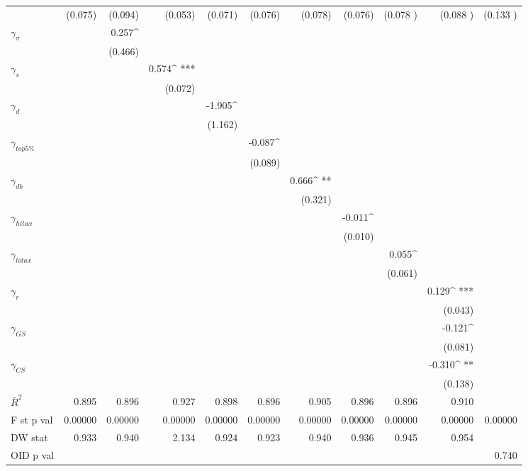 \begin{sidewaystable}
\begin{center}
\begin{tabular}{@{}ld{6}d{6}d{6}d{6}d{6}d{6}d{6}d{6}d{6}d{6}@{}}
 &   (0.075)  &   (0.094)  &   (0.053)  &   (0.071)  &   (0.076)  &   (0.078)  &   (0.076)  &   (0.078 )  &   (0.088 )  &   (0.133 ) \\
 $\gamma_{\sigma}$   &   & 0.257^{ }  &  &  &  & & & & & \\
 &   &  (0.466)  &  &   &  & & & & & \\
 $\gamma_s$   &   & & 0.574^{ ***}  &  &  & & & & & \\
 &   &  & (0.072)  &  &  & & & & & \\
 $\gamma_d$   &   & & &-1.905^{ }  &  &  & & & & \\
 &   &  &  &(1.162)  &  &  & & & & \\
 $\gamma_{top5\%}$   &   & & & & -0.087^{ }  &  &  & & & \\
 &   &  &  & & (0.089)  &  &  & & &  \\
 $\gamma_{db}$   &   & & & & & 0.666^{ **}    &  & & &  \\
 &   &  & & & & (0.321)    &  & & &   \\
 $\gamma_{hitax}$   &   & & & & & & -0.011^{ }  &  &  &  \\
 &  & &  & & & & (0.010)  &  &  &  \\
 $\gamma_{lotax}$   &   & & & & & & &0.055^{ }   &  &  \\
 &  & & & & & & & (0.061)   &  & \\
 $\gamma_{r}$  &   & & & & & & & & 0.129^{ ***}  &  \\
 &   &  & & & & & & & (0.043)  &  \\
 $\gamma_{GS}$  &  & & & & & & & &  -0.121^{ }  & \\
 &   & & & & & & & &  (0.081)  &   \\
 $\gamma_{CS}$  &   & & & & & & & &  -0.310^{ **}  &  \\
 &  & & & & & & & &  (0.138)  &  \\
\midrule 
 $\bar{R}^2$  & 0.895  & 0.896  & 0.927  & 0.898  & 0.896  & 0.905  & 0.896  & 0.896  & 0.910  & \\
 F st p val  & 0.00000  & 0.00000  & 0.00000  & 0.00000  & 0.00000  & 0.00000  & 0.00000  & 0.00000  & 0.00000  & 0.00000\\
DW stat  & 0.933  & 0.940  & 2.134  & 0.924  & 0.923  & 0.940  & 0.936  & 0.945  & 0.954 & \\
OID p val &  & & & &  & & & & &0.740\\
\bottomrule
\end{tabular}
\end{center}

\end{sidewaystable}
